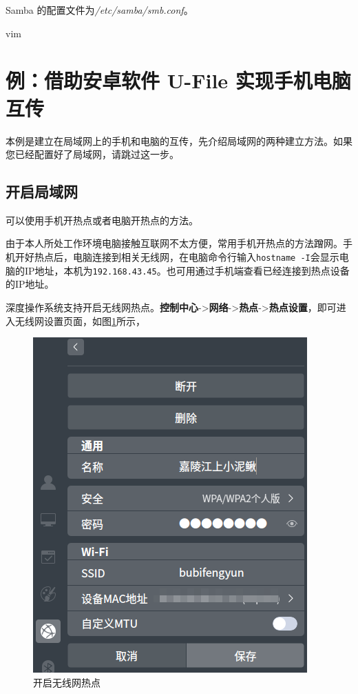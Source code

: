 \documentclass[doctor,openright,twoside]{sjtuthesis}
\newcommand{\passthrough}[1]{#1}
\theoremstyle{plain}
\theoremstyle{definition}
\theoremstyle{remark}
\theoremstyle{ocrenumbox}
\theoremstyle{plain}
\begin{document}
Samba 的配置文件为\emph{/etc/samba/smb.conf}。

vim

\hypertarget{-u-file-}{%
\section{例：借助安卓软件 U-File 实现手机电脑互传}\label{-u-file-}}

本例是建立在局域网上的手机和电脑的互传，先介绍局域网的两种建立方法。如果您已经配置好了局域网，请跳过这一步。

\subsection{开启局域网}

可以使用手机开热点或者电脑开热点的方法。

由于本人所处工作环境电脑接触互联网不太方便，常用手机开热点的方法蹭网。手机开好热点后，电脑连接到相关无线网，在电脑命令行输入\passthrough{\lstinline!hostname -I!}会显示电脑的IP地址，本机为\passthrough{\lstinline!192.168.43.45!}。也可用通过手机端查看已经连接到热点设备的IP地址。

深度操作系统支持开启无线网热点。\textbf{控制中心}-\textgreater{}\textbf{网络}-\textgreater{}\textbf{热点}-\textgreater{}\textbf{热点设置}，即可进入无线网设置页面，如图\ref{samba-hotwif}所示，

\begin{figure}
\centering
\includegraphics{images/samba-hotwifi.png}
\caption{开启无线网热点\label{samba-hotwif}}
\end{figure}
\end{document}
